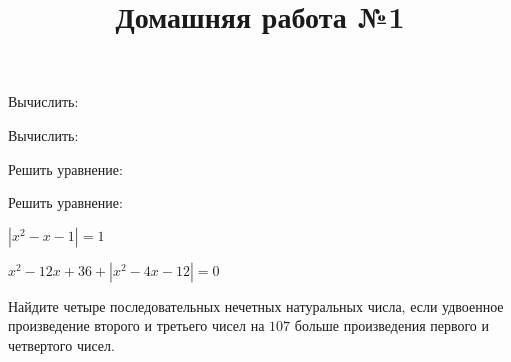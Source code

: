\begin{listofex}
	\item Вычислить:
	\begin{enumcols}[itemcolumns=2]
		\item {}
		\item {}
		\item {}
		\item {}
		\item {}
		\item {}
	\end{enumcols}
	\item Вычислить:
	\begin{enumcols}[itemcolumns=2]
		\item {}
		\item {}
		\item {}
		\item {}
	\end{enumcols}
	\item Решить уравнение:
	\begin{enumcols}[itemcolumns=2]
		\item {}
		\item {}
		\item {}
		\item {}
		\item {}
	\end{enumcols}
	\item Решить уравнение:
	\begin{enumcols}[itemcolumns=2]
		\item \( |x^2-x-1|=1 \)
		\item \( x^2-12x+36+|x^2-4x-12|=0 \)
	\end{enumcols}
	\item Найдите четыре последовательных нечетных натуральных числа, если удвоенное
	произведение второго и третьего чисел на \( 107 \) больше произведения первого и четвертого
	чисел.
\end{listofex}
\newpage
\title{Домашняя работа №1}
